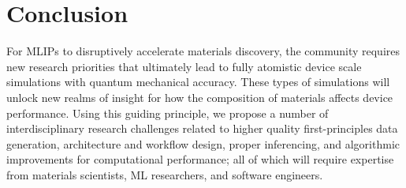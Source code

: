 \vspace{-0.2cm}
\section{Conclusion}
\vspace{-0.1cm}
For MLIPs to disruptively accelerate materials discovery, the community requires new research priorities that ultimately lead to fully atomistic device scale simulations with quantum mechanical accuracy. These types of simulations will unlock new realms of insight for how the composition of materials affects device performance. Using this guiding principle, we propose a number of interdisciplinary research challenges related to higher quality first-principles data generation, architecture and workflow design, proper inferencing, and algorithmic improvements for computational performance; all of which will require expertise from materials scientists, ML researchers, and software engineers.

